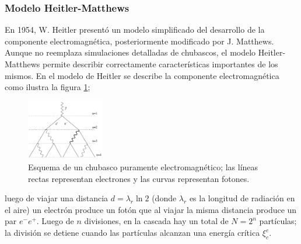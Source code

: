 		\subsubsection*{Modelo Heitler-Matthews}
		En 1954, W. Heitler presentó un modelo simplificado del desarrollo de la componente electromagnética, posteriormente modificado por J. Matthews. Aunque no reemplaza simulaciones detalladas de chubascos, el modelo Heitler-Matthews permite describir correctamente características importantes de los mismos. En el modelo de Heitler se describe la componente electromagnética como ilustra la figura \ref{fig:heitler_em}; 
		\begin{figure}
		\includegraphics[width=0.3\textwidth]{Figuras/heitler_em.png} 
		\caption{Esquema de un chubasco puramente electromagnético; las líneas rectas representan electrones y las curvas representan fotones.}
		\label{fig:heitler_em}
		\end{figure}		
		luego de viajar una distancia $d=\lambda_r \ln 2$ (donde $\lambda_r$ es la longitud de radiación en el aire) un electrón produce un fotón que al viajar la misma distancia produce un par $e^- e^+$. Luego de $n$ divisiones, en la cascada hay un total de $N=2^n$ partículas; la división se detiene cuando las partículas alcanzan una energía crítica $\xi^e_c$. \\
		
